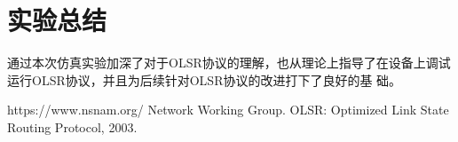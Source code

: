 \documentclass[a4paper,12pt]{report}
\begin{document}
\chapter{实验总结}
\begin{spacing}{1.5}
通过本次仿真实验加深了对于OLSR协议的理解，也从理论上指导了在设备上调试运行OLSR协议，并且为后续针对OLSR协议的改进打下了良好的基
础。
\end{spacing}


\begin{thebibliography}{99}
\songti {} 	
	https://www.nsnam.org/
	Network Working Group. OLSR: Optimized Link State Routing Protocol, 2003.
	
\end{thebibliography}

\end{document}
